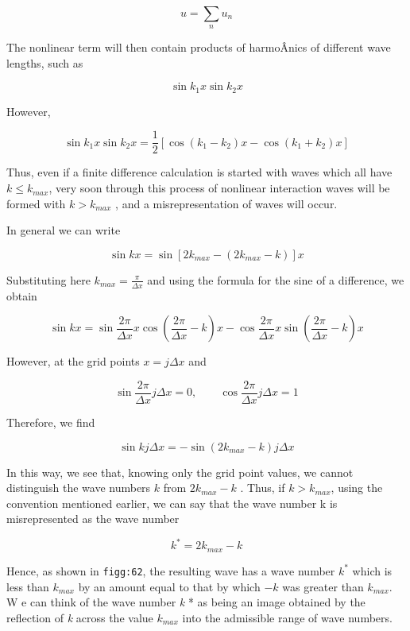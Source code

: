 \[u = \sum_{n}^{}u_{n}\]

The nonlinear term will then contain products of harmoÂ­nics of different
wave lengths, such as

\[\sin{k_1}x\sin{k_2}x\]

However,

\[\sin{k_1 x}\sin{k_2 x} = \frac{1}{2}
\left\lbrack \cos{( k_{1} - k_{2} )x - \cos{( k_{1} + k_{2} )x}} \right\rbrack\]

Thus, even if a finite difference calculation is started with waves
which all have \(k \leq k_{max}\), very soon through this process of
nonlinear interaction waves will be formed with \(k > k_{max}\) , and a
misrepresentation of waves will occur.

In general we can write

\[\sin{kx} = \sin{\left[ 2 k_{max} - ( 2 k_{max} - k ) \right] x}\]

Substituting here \(k_{max} = \frac{\pi}{\Delta x}\) and using the
formula for the sine of a difference, we obtain

\[\sin{kx} = \sin{\frac{2\pi}{\Delta x}x}\cos{\left( \frac{2\pi}{\Delta x} 
- k \right)}x - \cos{\frac{2\pi}{\Delta x}x}\sin{\left( \frac{2\pi}{\Delta x} - k \right)}x\]

However, at the grid points \(x = j\Delta x\) and

\[\sin\frac{2\pi}{\Delta x}j\Delta x = 0, \qquad \cos{\frac{2\pi}{\Delta x}j\Delta x = 1}\]

Therefore, we find

{\[\sin{k j \Delta x} = -\sin{\left( 2k_{max} - k \right)j\Delta x}\]}

In this way, we see that, knowing only the grid point values, we cannot
distinguish the wave numbers \(k\) from \(2k_{max} - k\) . Thus, if
\(k > k_{max}\), using the convention mentioned earlier, we can say that
the wave number k is misrepresented as the wave number

{\[k^{*} = 2k_{max} - k\]}

Hence, as shown in \texttt{figg:62}, the resulting wave has a wave
number \(k^{*}\) which is less than \(k_{max}\) by an amount equal to
that by which \(- k\) was greater than \( k_{max}\). W e can think of
the wave number \emph{k} * as being an image obtained by the reflection
of \emph{k} across the value \(k_{max}\) into the admissible range of
wave numbers.

\begin{figure}
\centering
{}
\caption{}
\end{figure}

